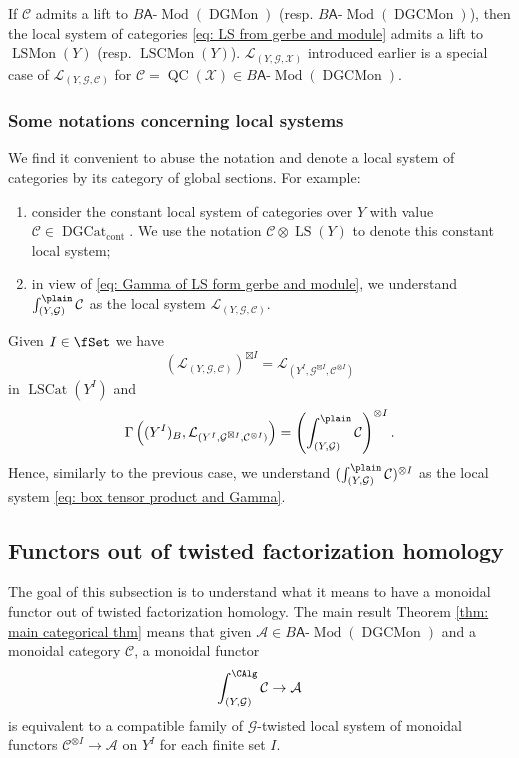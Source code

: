 \documentclass[10pt]{amsart}
\newcommand{\sssec}{\subsubsection}
\theoremstyle{remark}
\newcommand{\on}{\operatorname}
\newcommand{\cA}{\mathcal{A}}
\newcommand{\cC}{\mathcal{C}}
\newcommand{\cG}{\mathcal{G}}
\newcommand{\cL}{\mathcal{L}}
\newcommand{\cX}{\mathcal{X}}
\newcommand{\DGcat}{\on{DGCat}_{\on{cont}}}
\newcommand{\LSCat}{\on{LSCat}}
\newcommand{\LSMon}{\on{LSMon}}
\newcommand{\LSCMon}{\on{LSCMon}}
\newcommand{\DGCatMon}{\on{DGMon}}
\newcommand{\DGCatSymMon}{\on{DGCMon}}
\newcommand{\lMod}{\text{-}\on{Mod}}
\newcommand{\QC}{\on{QC}}
\newcommand{\LS}{\on{LS}}
\newcommand{\sfA}{\mathsf{A}}
\begin{document}
If $\cC$ admits a lift to $B \sfA\lMod(\DGCatMon)$ (resp. $B\sfA\lMod(\DGCatSymMon)$), then the local system of categories \eqref{eq: LS from gerbe and module} admits a lift to $\LSMon(Y)$ (resp. $\LSCMon(Y)$). $\cL_{(Y,\cG,\cX)}$ introduced earlier is a special case of $\cL_{(Y,\cG,\cC)}$ for $\cC=\QC(\cX)\in B\sfA\lMod(\DGCatSymMon)$.

\sssec{Some notations concerning local systems}\label{sssec: some notations}
    We find it convenient to abuse the notation and denote a local system of categories by its category of global sections. For example:
    \begin{enumerate}
        \item consider the constant local system of categories over $Y$ with value $\cC\in\DGcat$. We use the notation $\cC\otimes \LS(Y)$ to denote this constant local system; 
        \item in view of \eqref{eq: Gamma of LS form gerbe and module}, we understand $\int^{\plain}_{(Y,\cG)}\cC$ as the local system $\cL_{(Y,\cG,\cC)}$.
    \end{enumerate}
 Given $I\in\fSet$ we have 
    \begin{equation}\label{eq: box tensor product and Gamma}
        (\cL_{(Y,\cG,\cC)})^{\boxtimes I}=  \cL_{(Y^I,\cG^{\boxtimes I},\cC^{\otimes I})}
    \end{equation}
    in $\LSCat(Y^I)$ and
    \[\Gamma\left((Y^I)_B,\cL_{(Y^I,\cG^{\boxtimes I},\cC^{\otimes I})}\right)=\left(\int^{\plain}_{(Y,\cG)}\cC\right)^{\otimes I}.\]
    Hence, similarly to the previous case, we understand $(\int^{\plain}_{(Y,\cG)}\cC)^{\otimes I}$ as the local system \eqref{eq: box tensor product and Gamma}.
    
     
    









\subsection{Functors out of twisted factorization homology}
The goal of this subsection is to understand what it means to have a monoidal functor out of twisted factorization homology. The main result Theorem \ref{thm: main categorical thm} means that given $\cA\in B\sfA\lMod(\DGCatSymMon)$ and a monoidal category $\cC$, a monoidal functor 
\[\int^{\CAlg}_{(Y,\cG)}\cC\rightarrow \cA\]
is equivalent to a compatible family of $\cG$-twisted local system of monoidal functors $\cC^{\otimes I}\rightarrow\cA$ on $Y^I$ for each finite set $I$.
\end{document}
